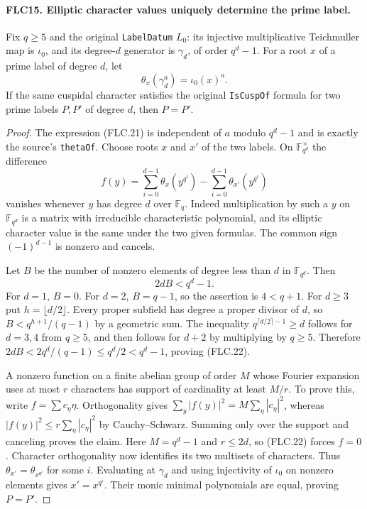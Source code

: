 \paragraph{FLC15. Elliptic character values uniquely determine the prime label.}
\label{claim:FLC15}
Fix $q\ge5$ and the original \texttt{LabelDatum} $L_0$:
its injective multiplicative Teichmuller map is $\iota_0$,
and its degree-$d$ generator is $\gamma_d$, of order $q^d-1$.
For a root $x$ of a prime label of degree $d$, let
\[
 \theta_x(\gamma_d^a)=\iota_0(x)^a.
 \tag{FLC.21}
\]
If the same cuspidal character satisfies the original
\texttt{IsCuspOf} formula for two prime labels $P,P'$ of
degree $d$, then $P=P'$.
\begin{proof}
The expression (FLC.21) is independent of $a$ modulo
$q^d-1$ and is exactly the source's \texttt{thetaOf}.
Choose roots $x$ and $x'$ of the two labels.  On
$\mathbb F_{q^d}^{\times}$ the difference
\[
 f(y)=\sum_{i=0}^{d-1}\theta_x(y^{q^i})
              -\sum_{i=0}^{d-1}\theta_{x'}(y^{q^i})
\]
vanishes whenever $y$ has degree $d$ over $\mathbb F_q$.
Indeed multiplication by such a $y$ on
$\mathbb F_{q^d}$ is a matrix with irreducible characteristic
polynomial, and its elliptic character value is the same
under the two given formulas.  The common sign
$(-1)^{d-1}$ is nonzero and cancels.

Let $B$ be the number of nonzero elements of degree less than
$d$ in $\mathbb F_{q^d}$.  Then
\[
                         2dB<q^d-1.                 \tag{FLC.22}
\]
For $d=1$, $B=0$.  For $d=2$, $B=q-1$, so the assertion is
$4<q+1$.  For $d\ge3$ put $h=\lfloor d/2\rfloor$.
Every proper subfield has degree a proper divisor of $d$,
so $B<q^{h+1}/(q-1)$ by a geometric sum.
The inequality $q^{\lceil d/2\rceil-1}\ge d$ follows for
$d=3,4$ from $q\ge5$, and then follows for $d+2$ by
multiplying by $q\ge5$.  Therefore
$2dB<2q^d/(q-1)\le q^d/2<q^d-1$, proving (FLC.22).

A nonzero function on a finite abelian group of order $M$
whose Fourier expansion uses at most $r$ characters has
support of cardinality at least $M/r$.  To prove this,
write $f=\sum c_\eta\eta$.  Orthogonality gives
$\sum_y|f(y)|^2=M\sum_\eta|c_\eta|^2$, whereas
$|f(y)|^2\le r\sum_\eta|c_\eta|^2$ by Cauchy--Schwarz.
Summing only over the support and canceling proves the claim.
Here $M=q^d-1$ and $r\le2d$, so (FLC.22) forces $f=0$.
Character orthogonality now identifies its two multisets of
characters.  Thus $\theta_{x'}=\theta_{x^{q^i}}$ for some $i$.
Evaluating at $\gamma_d$ and using injectivity of $\iota_0$
on nonzero elements gives $x'=x^{q^i}$.  Their monic minimal
polynomials are equal, proving $P=P'$.
\end{proof}

